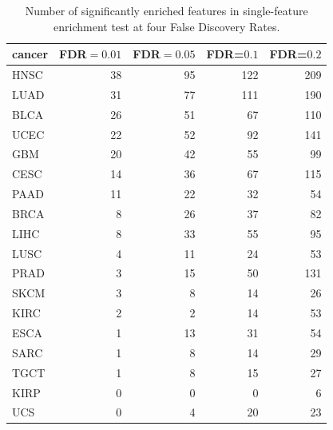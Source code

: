 \begin{table}
  \centering
  \begin{tabular}{l|r|r|r|r}
    \hline
    cancer & FDR$=0.01$ & FDR$=0.05$ & FDR=$0.1$ & FDR=$0.2$ \\
    \hline
    HNSC & 38 & 95 & 122 & 209\\
    
    LUAD & 31 & 77 & 111 & 190\\
    
    BLCA & 26 & 51 & 67 & 110\\
    
    UCEC & 22 & 52 & 92 & 141\\
    
    GBM & 20 & 42 & 55 & 99\\
    
    CESC & 14 & 36 & 67 & 115\\
    
    PAAD & 11 & 22 & 32 & 54\\
    
    BRCA & 8 & 26 & 37 & 82\\
    
    LIHC & 8 & 33 & 55 & 95\\
    
    LUSC & 4 & 11 & 24 & 53\\
    
    PRAD & 3 & 15 & 50 & 131\\
    
    SKCM & 3 & 8 & 14 & 26\\
    
    KIRC & 2 & 2 & 14 & 53\\
    
    ESCA & 1 & 13 & 31 & 54\\
    
    SARC & 1 & 8 & 14 & 29\\
    
    TGCT & 1 & 8 & 15 & 27\\
    
    KIRP & 0 & 0 & 0 & 6\\
    
    UCS & 0 & 4 & 20 & 23\\
    
  \end{tabular}\label{tab:single-featureFDR}
  \caption{Number of significantly enriched features in single-feature enrichment test at four False Discovery Rates.}
\end{table}

